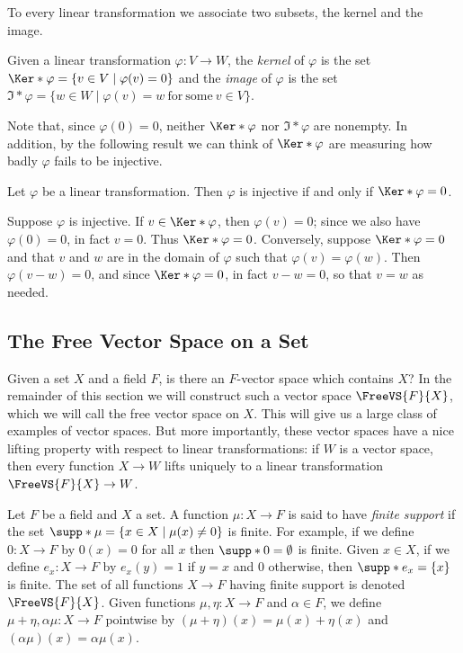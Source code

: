 To every linear transformation we associate two subsets, the kernel and the image.

\begin{dfn}
Given a linear transformation $\varphi : V \rightarrow W$, the \emph{kernel} of $\varphi$ is the set $\Ker*{\varphi} = \{v \in V \mid \varphi(v) = 0\}$ and the \emph{image} of $\varphi$ is the set $\Im*{\varphi} = \{w \in W \mid \varphi(v) = w\ \mathrm{for\ some}\ v \in V\}$.
\end{dfn}

Note that, since $\varphi(0) = 0$, neither $\Ker*{\varphi}$ nor $\Im*{\varphi}$ are nonempty. In addition, by the following result we can think of $\Ker*{\varphi}$ are measuring how badly $\varphi$ fails to be injective.

\begin{prp}
Let $\varphi$ be a linear transformation. Then $\varphi$ is injective if and only if $\Ker*{\varphi} = 0$.
\end{prp}

\begin{theproof}
Suppose $\varphi$ is injective. If $v \in \Ker*{\varphi}$, then $\varphi(v) = 0$; since we also have $\varphi(0) = 0$, in fact $v = 0$. Thus $\Ker*{\varphi} = 0$. Conversely, suppose $\Ker*{\varphi} = 0$ and that $v$ and $w$ are in the domain of $\varphi$ such that $\varphi(v) = \varphi(w)$. Then $\varphi(v-w) = 0$, and since $\Ker*{\varphi} = 0$, in fact $v-w = 0$, so that $v = w$ as needed.
\end{theproof}

\subsection*{The Free Vector Space on a Set}

Given a set $X$ and a field $F$, is there an $F$-vector space which contains $X$? In the remainder of this section we will construct such a vector space $\FreeVS{F}{X}$, which we will call the free vector space on $X$. This will give us a large class of examples of vector spaces. But more importantly, these vector spaces have a nice lifting property with respect to linear transformations: if $W$ is a vector space, then every function $X \rightarrow W$ lifts uniquely to a linear transformation $\FreeVS{F}{X} \rightarrow W$.

Let $F$ be a field and $X$ a set. A function $\mu : X \rightarrow F$ is said to have \emph{finite support} if the set $\supp*{\mu} = \{x \in X \mid \mu(x) \neq 0\}$ is finite. For example, if we define $0 : X \rightarrow F$ by $0(x) = 0$ for all $x$ then $\supp*{0} = \emptyset$ is finite. Given $x \in X$, if we define $e_x : X \rightarrow F$ by $e_x(y) = 1$ if $y = x$ and $0$ otherwise, then $\supp*{e_x} = \{x\}$ is finite. The set of all functions $X \rightarrow F$ having finite support is denoted $\FreeVS{F}{X}$. Given functions $\mu,\eta : X \rightarrow F$ and $\alpha \in F$, we define $\mu+\eta,\alpha\mu : X \rightarrow F$ pointwise by $(\mu+\eta)(x) = \mu(x) + \eta(x)$ and $(\alpha\mu)(x) = \alpha\mu(x)$.

